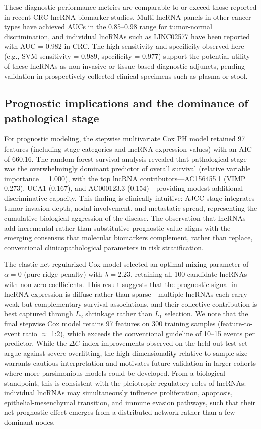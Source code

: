 \documentclass[fleqn,10pt]{wlscirep}
\begin{document}
These diagnostic performance metrics are comparable to or exceed those reported in recent CRC lncRNA biomarker studies. Multi-lncRNA panels in other cancer types have achieved AUCs in the 0.85–0.98 range for tumor-normal discrimination, and individual lncRNAs such as LINC02577 have been reported with AUC = 0.982 in CRC. The high sensitivity and specificity observed here (e.g., SVM sensitivity = 0.989, specificity = 0.977) support the potential utility of these lncRNAs as non-invasive or tissue-based diagnostic adjuncts, pending validation in prospectively collected clinical specimens such as plasma or stool.

\subsection*{Prognostic implications and the dominance of pathological stage}

For prognostic modeling, the stepwise multivariate Cox PH model retained 97 features (including stage categories and lncRNA expression values) with an AIC of 660.16. The random forest survival analysis revealed that pathological stage was the overwhelmingly dominant predictor of overall survival (relative variable importance = 1.000), with the top lncRNA contributors—AC156455.1 (VIMP = 0.273), UCA1 (0.167), and AC000123.3 (0.154)—providing modest additional discriminative capacity. This finding is clinically intuitive: AJCC stage integrates tumor invasion depth, nodal involvement, and metastatic spread, representing the cumulative biological aggression of the disease. The observation that lncRNAs add incremental rather than substitutive prognostic value aligns with the emerging consensus that molecular biomarkers complement, rather than replace, conventional clinicopathological parameters in risk stratification\cite{RN30}.

The elastic net regularized Cox model selected an optimal mixing parameter of $\alpha = 0$ (pure ridge penalty) with $\lambda = 2.23$, retaining all 100 candidate lncRNAs with non-zero coefficients. This result suggests that the prognostic signal in lncRNA expression is diffuse rather than sparse—multiple lncRNAs each carry weak but complementary survival associations, and their collective contribution is best captured through $L_2$ shrinkage rather than $L_1$ selection. We note that the final stepwise Cox model retains 97 features on 300 training samples (feature-to-event ratio $\approx$ 1:2), which exceeds the conventional guideline of 10–15 events per predictor. While the $\Delta C$-index improvements observed on the held-out test set argue against severe overfitting, the high dimensionality relative to sample size warrants cautious interpretation and motivates future validation in larger cohorts where more parsimonious models could be developed. From a biological standpoint, this is consistent with the pleiotropic regulatory roles of lncRNAs: individual lncRNAs may simultaneously influence proliferation, apoptosis, epithelial-mesenchymal transition, and immune evasion pathways, such that their net prognostic effect emerges from a distributed network rather than a few dominant nodes\cite{RN3}.
\end{document}
